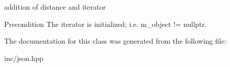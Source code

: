 addition of distance and iterator 

\begin{DoxyPrecond}{Precondition}
The iterator is initialized; i.\+e. {\ttfamily m\+\_\+object != nullptr}. 
\end{DoxyPrecond}


The documentation for this class was generated from the following file\+:\begin{DoxyCompactItemize}
\item 
inc/json.\+hpp\end{DoxyCompactItemize}
